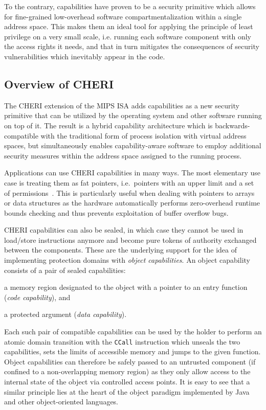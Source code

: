 \documentclass[a4paper,12pt,twoside,openright]{report}
\newcommand{\insn}[1]{\texttt{#1}}
\begin{document}
To the contrary, capabilities have proven to be a security primitive which allows for fine-grained low-overhead software compartmentalization within a single address space. This makes them an ideal tool for applying the principle of least privilege on a very small scale, i.e. running each software component with only the access rights it needs, and that in turn mitigates the consequences of security vulnerabilities which inevitably appear in the code. 

\subsection{Overview of CHERI}

The CHERI extension of the MIPS ISA adds capabilities as a new security primitive that can be utilized by the operating system and other software running on top of it. The result is a hybrid capability architecture which is backwards-compatible with the traditional form of process isolation with virtual address spaces, but simultaneously enables capability-aware software to employ additional security measures within the address space assigned to the running process.

Applications can use CHERI capabilities in many ways. The most elementary use case is treating them as fat pointers, i.e.\ pointers with an upper limit and a set of permissions~\cite{kwon2013low}. This is particularly useful when dealing with pointers to arrays or data structures as the hardware automatically performs zero-overhead runtime bounds checking and thus prevents exploitation of buffer overflow bugs. 

CHERI capabilities can also be sealed, in which case they cannot be used in load/store instructions anymore and become pure tokens of authority exchanged between the components. These are the underlying support for the idea of implementing protection domains with \emph{object capabilities}. An object capability consists of a pair of sealed capabilities: 
\begin{inparaenum}
\item a memory region designated to the object with a pointer to an entry function (\emph{code capability}), and
\item a protected argument (\emph{data capability}).
\end{inparaenum}
Each such pair of compatible capabilities can be used by the holder to perform an atomic domain transition with the \insn{CCall} instruction which unseals the two capabilities, sets the limits of accessible memory and jumps to the given function. Object capabilities can therefore be safely passed to an untrusted component (if confined to a non-overlapping memory region) as they only allow access to the internal state of the object via controlled access points. It is easy to see that a similar principle lies at the heart of the object paradigm implemented by Java and other object-oriented languages.
\end{document}
